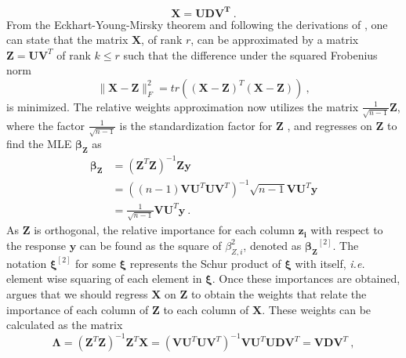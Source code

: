 \begin{equation}
    \label{eq:SVD}
    \mathbf{X} = \mathbf{UDV^T} \ .
\end{equation}
From the Eckhart-Young-Mirsky theorem \citep{mirsky-theorem} and following the derivations of \citet{johnson_minimization_trace}, one can state that the matrix $\mathbf{X}$, of rank $r$, can be approximated by a matrix $\mathbf{Z} = \mathbf{U}\mathbf{V}^T$ of rank $k\leq r$ such that the difference under the squared Frobenius norm
\begin{equation}
    \lVert \mathbf{X} - \mathbf{Z} \rVert_F^2 = tr \left( (\mathbf{X} - \mathbf{Z})^T(\mathbf{X} - \mathbf{Z}) \right) \ ,
\end{equation}
is minimized. The relative weights approximation now utilizes the matrix \citep{johnson_relative_weights} $\frac{1}{\sqrt{n-1}}\mathbf{{Z}}$, where the factor $\frac{1}{\sqrt{n-1}}$ is the standardization factor for $\mathbf{Z}$ \citep{matre}, and regresses on $\mathbf{Z}$ to find the MLE $\boldsymbol{\beta_Z}$ as
\begin{equation}
    \begin{aligned}
        \boldsymbol{\beta_Z} & = (\mathbf{Z}^T\mathbf{Z})^{-1}\mathbf{Z}\mathbf{y} \\
        & = \left((n-1) \mathbf{VU}^T\mathbf{UV}^T \right)^{-1} \sqrt{n-1}\mathbf{VU}^T\mathbf{y} \\
        & = \frac{1}{\sqrt{n-1}}\mathbf{V}\mathbf{U}^T\mathbf{y} \ .
    \end{aligned}
\end{equation} 
As $\mathbf{Z}$ is orthogonal, the relative importance for each column $\mathbf{z_i}$ with respect to the response $\mathbf{y}$ can be found as the square of $\beta_{Z, i}^2$, denoted as $\boldsymbol{\beta_Z}^{[2]}$. 
The notation $\boldsymbol{\xi}^{[2]}$ for some $\boldsymbol{\xi}$ represents the Schur product of $\boldsymbol{\xi}$ with itself, \textit{i.e.} element wise squaring of each element in $\boldsymbol{\xi}$.
Once these importances are obtained, \citet{johnson_relative_weights} argues that we should regress $\mathbf{X}$ on $\mathbf{Z}$ to obtain the weights that relate the importance of each column of $\mathbf{Z}$ to each column of $\mathbf{X}$. These weights can be calculated as the matrix
\begin{equation}
    \label{eq:lambda_rw}
    \boldsymbol{\Lambda} = (\mathbf{Z}^T\mathbf{Z})^{-1}\mathbf{Z}^T\mathbf{X} = (\mathbf{V}\mathbf{U}^T\mathbf{U}\mathbf{V}^T)^{-1}\mathbf{V}\mathbf{U}^T\mathbf{U}\mathbf{D}\mathbf{V}^T = \mathbf{V}\mathbf{D}\mathbf{V}^T \ ,
\end{equation}
